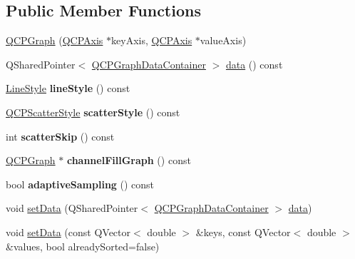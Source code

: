 \subsection*{Public Member Functions}
\begin{DoxyCompactItemize}
\item 
\hyperlink{class_q_c_p_graph_a0393a38cf7183cbf46348eb6cf9a5a6c}{Q\+C\+P\+Graph} (\hyperlink{class_q_c_p_axis}{Q\+C\+P\+Axis} $\ast$key\+Axis, \hyperlink{class_q_c_p_axis}{Q\+C\+P\+Axis} $\ast$value\+Axis)
\item 
Q\+Shared\+Pointer$<$ \hyperlink{class_q_c_p_data_container}{Q\+C\+P\+Graph\+Data\+Container} $>$ \hyperlink{class_q_c_p_graph_a141aa31a1f19bbd0ce60f55eaeb9ea60}{data} () const
\item 
\mbox{\label{class_q_c_p_graph_ac3e6f4b3387338df45992b47691b2551}} 
\hyperlink{class_q_c_p_graph_ad60175cd9b5cac937c5ee685c32c0859}{Line\+Style} {\bfseries line\+Style} () const
\item 
\mbox{\label{class_q_c_p_graph_a36d5b641db08e27527827c212542bbbd}} 
\hyperlink{class_q_c_p_scatter_style}{Q\+C\+P\+Scatter\+Style} {\bfseries scatter\+Style} () const
\item 
\mbox{\label{class_q_c_p_graph_a44487a3a706605bb9fc97ad5e05d347e}} 
int {\bfseries scatter\+Skip} () const
\item 
\mbox{\label{class_q_c_p_graph_a84277b1655474453a5c83318053414d5}} 
\hyperlink{class_q_c_p_graph}{Q\+C\+P\+Graph} $\ast$ {\bfseries channel\+Fill\+Graph} () const
\item 
\mbox{\label{class_q_c_p_graph_a1ba934b9621270b9a40fcdd2d9ba2adb}} 
bool {\bfseries adaptive\+Sampling} () const
\item 
void \hyperlink{class_q_c_p_graph_a1eae9429a316b008e2d99b2d65a54395}{set\+Data} (Q\+Shared\+Pointer$<$ \hyperlink{class_q_c_p_data_container}{Q\+C\+P\+Graph\+Data\+Container} $>$ \hyperlink{class_q_c_p_graph_a141aa31a1f19bbd0ce60f55eaeb9ea60}{data})
\item 
void \hyperlink{class_q_c_p_graph_a73578d786532132310a926c3cd529b29}{set\+Data} (const Q\+Vector$<$ double $>$ \&keys, const Q\+Vector$<$ double $>$ \&values, bool already\+Sorted=false)
\item 

\end{DoxyCompactItemize}
